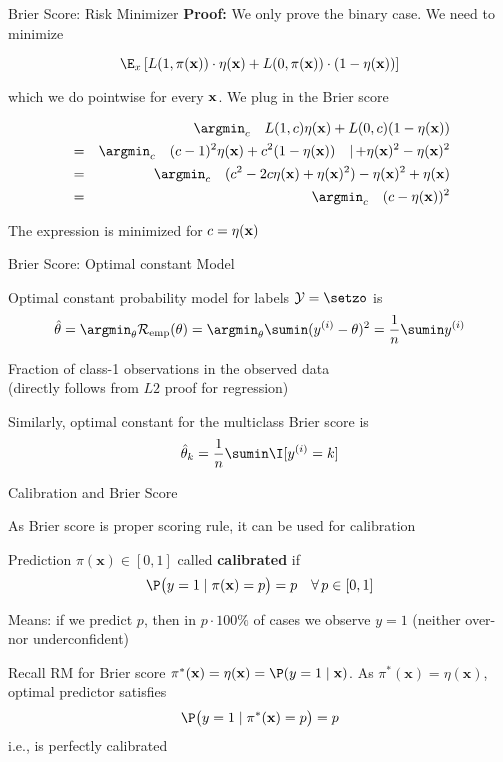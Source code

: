 \documentclass[11pt,compress,t,notes=noshow, xcolor=table]{beamer}
\begin{document}
\begin{frame}{Brier Score: Risk Minimizer}
\textbf{Proof: } We only prove the binary case. We need to minimize 

$$
\E_x \left[L(1, \pix) \cdot \eta(\xv) + L(0, \pix) \cdot (1 - \eta(\xv)) \right]
$$

which we do pointwise for every $\mathbf{x}$. We plug in the Brier score

\vspace*{-0.3cm}

\begin{eqnarray*}
	&& \argmin_c \quad L(1, c) \eta(\xv) + L(0, c) (1 - \eta(\xv)) \\ 
	&=&  \argmin_c \quad (c - 1)^2 \eta(\xv) + c^2 (1 - \eta(\xv))  \quad |{\,+\eta(\xv)^2-\eta(\xv)^2}\\
  &=&  \argmin_c \quad (c^2 -2c\eta(\xv) + \eta(\xv)^2)- \eta(\xv)^2 + \eta(\xv) \\
	&=&  \argmin_c \quad (c - \eta(\xv))^2
\end{eqnarray*}

The expression is minimized for $c = \eta(\mathbf{x})$

\end{frame}

\begin{framei}[sep=L]{Brier Score: Optimal constant Model}

    \item Optimal constant probability model for labels $\Yspace = \setzo$ is 
    $$\thetah=\argmin_{\theta} \riske(\theta) = \argmin_{\theta} \sumin (\yi - \theta)^2 = \frac{1}{n} \sumin \yi$$
    \item Fraction of class-1 observations in the observed data\\ (directly follows from $L2$ proof for regression)
    \item Similarly, optimal constant for the multiclass Brier score is $$\thetah_k = \frac{1}{n}\sumin \I [\yi = k]$$

\end{framei}

\begin{framei}[sep=L]{Calibration and Brier Score}

    \item As Brier score is proper scoring rule, it can be used for calibration
    \item Prediction $\pi(\mathbf{x})\in[0,1]$ called \textbf{calibrated} if 
$$\P\bigl(y=1 \mid \pi(\mathbf{x})=p\bigr)=p \quad \forall\, p\in[0,1]$$
    \item Means: if we predict $p$, then in $p \cdot 100\%$ of cases we observe $y=1$ (neither over- nor underconfident)
    \item Recall RM for Brier score $\pi^*(\mathbf{x}) = \eta(\mathbf{x}) = \P(y=1 \mid \mathbf{x})$. As \(\pi^*(\mathbf{x})=\eta(\mathbf{x})\), optimal predictor satisfies $$\P\bigl(y=1 \mid \pi^*(\mathbf{x})=p\bigr)=p$$
i.e., is perfectly calibrated


\end{framei}
\end{document}

